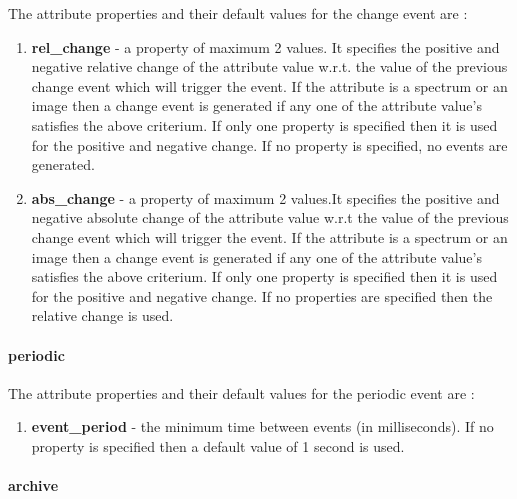 The attribute properties and their default values for the \textquotedbl{}change\textquotedbl{}
event are :
\begin{enumerate}
\item \textbf{rel\_change} - a property of maximum 2
values. It specifies the positive and negative relative change of
the attribute value w.r.t. the value of the previous change event
which will trigger the event. If the attribute is a spectrum or an
image then a change event is generated if any one of the attribute
value's satisfies the above criterium. If only one property is specified
then it is used for the positive and negative change. If no property
is specified, no events are generated.
\item \textbf{abs\_change} - a property of maximum 2
values.It specifies the positive and negative absolute change of the
attribute value w.r.t the value of the previous change event which
will trigger the event. If the attribute is a spectrum or an image
then a change event is generated if any one of the attribute value's
satisfies the above criterium. If only one property is specified then
it is used for the positive and negative change. If no properties
are specified then the relative change is used.
\end{enumerate}

\paragraph{periodic}

The attribute properties and their default values for the \textquotedbl{}periodic\textquotedbl{}
event are :
\begin{enumerate}
\item \textbf{event\_period} - the minimum time between
events (in milliseconds). If no property is specified then a default
value of 1 second is used.
\end{enumerate}

\paragraph{archive}

